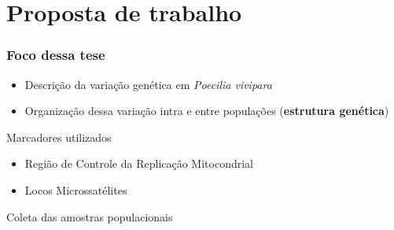 \documentclass{beamer}
\begin{document}
\section{Proposta de trabalho}
\begin{frame}
  \frametitle{ Foco dessa tese}

  \begin{itemize}[<+->]
\item Descri\c{c}ão da variação genética em \textit{Poecilia vivipara}
\item  Organização dessa variação intra e entre populações (\textbf{estrutura genética})
\end{itemize}
\pause
\begin{block}{Marcadores utilizados}
    \begin{itemize}
\item Região de Controle da Replica\c{c}ão Mitocondrial
\item Locos Microssatélites
\end{itemize}
 
\end{block}
\end{frame}

\begin{frame}{Coleta das amostras populacionais}
\centering

\end{frame}

\end{document}
